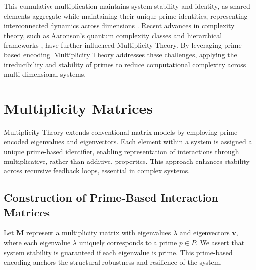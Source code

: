\documentclass{article}
\theoremstyle{plain}
\begin{document}
This cumulative multiplication maintains system stability and identity, as shared elements aggregate while maintaining their unique prime identities, representing interconnected dynamics across dimensions \citep{blizard1989, kumar1990}. Recent advances in complexity theory, such as Aaronson’s quantum complexity classes and hierarchical frameworks \citep{aaronson2005}, have further influenced Multiplicity Theory. By leveraging prime-based encoding, Multiplicity Theory addresses these challenges, applying the irreducibility and stability of primes to reduce computational complexity across multi-dimensional systems.

\section{Multiplicity Matrices}

Multiplicity Theory extends conventional matrix models by employing prime-encoded eigenvalues and eigenvectors. Each element within a system is assigned a unique prime-based identifier, enabling representation of interactions through multiplicative, rather than additive, properties. This approach enhances stability across recursive feedback loops, essential in complex systems.

\subsection{Construction of Prime-Based Interaction Matrices}
Let \( \mathbf{M} \) represent a multiplicity matrix with eigenvalues \( \lambda \) and eigenvectors \( \mathbf{v} \), where each eigenvalue \( \lambda \) uniquely corresponds to a prime \( p \in P \). We assert that system stability is guaranteed if each eigenvalue is prime. This prime-based encoding anchors the structural robustness and resilience of the system.
\end{document}
